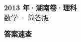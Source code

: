 \documentclass[zihao=-4, a4paper]{ctexart}
\begin{document}
\begin{center}
  {\Large\bfseries 2013 年·湖南卷·理科}\\[4pt]
  {\large 数学 · 简答版}
\end{center}
\medskip
{}

\clearpage
{}
\begin{center}{\Large\bfseries 答案速查}\end{center}
\medskip

\end{document}
